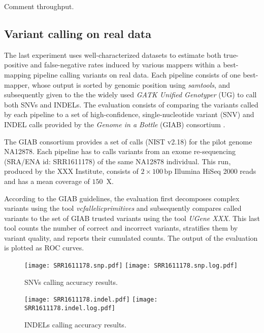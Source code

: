 Comment throughput.

\subsection{Variant calling on real data}
\label{sec:yara:eval:calling}


The last experiment uses well-characterized datasets to estimate both true-positive and false-negative rates induced by various mappers within a best-mapping pipeline calling variants on real data.
Each pipeline consists of one best-mapper, whose output is sorted by genomic position using \emph{samtools}, and subsequently given to the the widely used \emph{GATK Unified Genotyper} (UG) \citep{DePristo2012} to call both SNVs and INDELs.
The evaluation consists of comparing the variants called by each pipeline to a set of high-confidence, single-nucleotide variant (SNV) and INDEL calls provided by the \emph{Genome in a Bottle} (GIAB) consortium \citep{Zook2014}.

The GIAB consortium provides a set of calls (NIST v2.18) for the pilot genome NA12878.
Each pipeline has to calls variants from an exome re-sequencing (SRA/ENA id: SRR1611178) of the same NA12878 individual.
This run, produced by the XXX Institute, consists of $2 \times 100\,\text{bp}$ Illumina HiSeq 2000 reads and has a mean coverage of $150$~X.

According to the GIAB guidelines, the evaluation first decomposes complex variants using the tool \emph{vcfallelicprimitives} and subsequently compares called variants to the set of GIAB trusted variants using the tool \emph{UGene XXX}.
This last tool counts the number of correct and incorrect variants, stratifies them by variant quality, and reports their cumulated counts.
The output of the evaluation is plotted as ROC curves.

\begin{figure}[t]
\begin{center}
\caption[SNPs calling accuracy results]{SNVs calling accuracy results.}
\label{fig:yara:calling-snps}
\texttt{[image: SRR1611178.snp.pdf]}
\texttt{[image: SRR1611178.snp.log.pdf]}
\end{center}
\end{figure}

\begin{figure}[t]
\begin{center}
\caption[INDELs calling accuracy results]{INDELs calling accuracy results.}
\label{fig:yara:calling-indels}
\texttt{[image: SRR1611178.indel.pdf]}
\texttt{[image: SRR1611178.indel.log.pdf]}
\end{center}
\end{figure}

